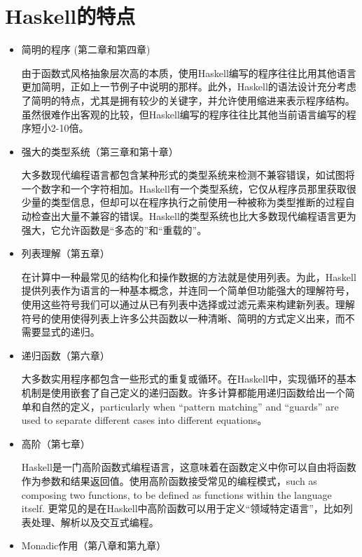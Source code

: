 \section{Haskell的特点}
\begin{itemize}
\item 简明的程序 (第二章和第四章)

由于函数式风格抽象层次高的本质，使用Haskell编写的程序往往比用其他语言更加简明，正如上一节例子中说明的那样。此外，Haskell的语法设计充分考虑了简明的特点，尤其是拥有较少的关键字，并允许使用缩进来表示程序结构。虽然很难作出客观的比较，但Haskell编写的程序往往比其他当前语言编写的程序短小2-10倍。\newline

\item 强大的类型系统（第三章和第十章）

大多数现代编程语言都包含某种形式的类型系统来检测不兼容错误，如试图将一个数字和一个字符相加。Haskell有一个类型系统，它仅从程序员那里获取很少量的类型信息，但却可以在程序执行之前使用一种被称为类型推断的过程自动检查出大量不兼容的错误。Haskell的类型系统也比大多数现代编程语言更为强大，它允许函数是“多态的”和“重载的”。\newline

\item 列表理解（第五章）

在计算中一种最常见的结构化和操作数据的方法就是使用列表。为此，Haskell提供列表作为语言的一种基本概念，并连同一个简单但功能强大的理解符号，使用这些符号我们可以通过从已有列表中选择或过滤元素来构建新列表。理解符号的使用使得列表上许多公共函数以一种清晰、简明的方式定义出来，而不需要显式的递归。

\item 递归函数（第六章）

大多数实用程序都包含一些形式的重复或循环。在Haskell中，实现循环的基本机制是使用嵌套了自己定义的递归函数。许多计算都能用递归函数给出一个简单和自然的定义，particularly when “pattern matching” and “guards” are used to separate different cases into
different equations。

\item 高阶（第七章）

Haskell是一门高阶函数式编程语言，这意味着在函数定义中你可以自由将函数作为参数和结果返回值。使用高阶函数接受常见的编程模式，such as composing two functions, to be defined as functions within the language itself.
更常见的是在Haskell中高阶函数可以用于定义“领域特定语言”，比如列表处理、解析以及交互式编程。

\item Monadic作用（第八章和第九章）


\end{itemize}
